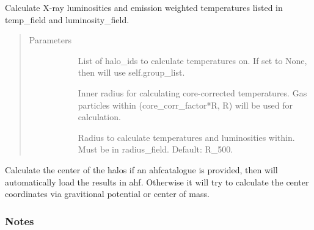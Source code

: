 \documentclass[letterpaper,10pt,english]{sphinxmanual}
\begin{document}
\begin{fulllineitems}
\begin{fulllineitems}
\label{\detokenize{halo_analysis:modules.halo_analysis.halo_props.calcu_tx_lx}}
Calculate X-ray luminosities and emission weighted 
temperatures listed in temp\_field and luminosity\_field.
\begin{quote}\begin{description}
\item[{Parameters}] \leavevmode\begin{description}
\item[{}] \leavevmode
List of halo\_ids to calculate temperatures on. 
If set to None, then will use self.group\_list.

\item[{}] \leavevmode
Inner radius for calculating core-corrected 
temperatures. Gas particles within 
(core\_corr\_factor*R, R) will be used for calculation.

\item[{}] \leavevmode
Radius to calculate temperatures and luminosities 
within. Must be in radius\_field. Default: R\_500.

\end{description}

\end{description}\end{quote}

\end{fulllineitems}


\begin{fulllineitems}
\label{\detokenize{halo_analysis:modules.halo_analysis.halo_props.get_center}}
Calculate the center of the halos if an ahfcatalogue is 
provided, then will automatically load the results in ahf. 
Otherwise it will try to calculate the center coordinates 
via gravitional potential or center of mass.
\subsubsection*{Notes}


\end{fulllineitems}
\end{fulllineitems}
\end{document}
